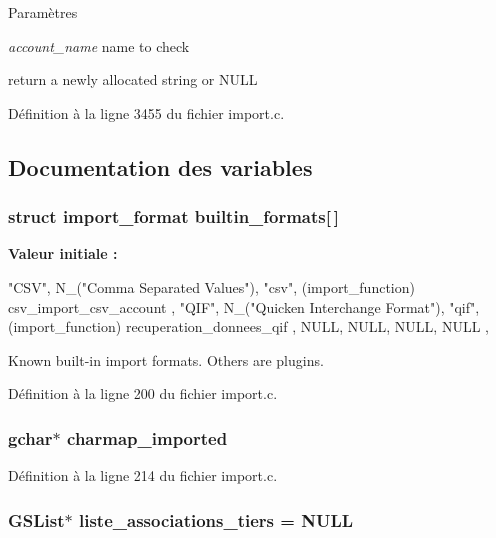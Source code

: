\begin{DoxyParams}{Paramètres}
\item[{\em account\_\-name}]name to check\end{DoxyParams}
return a newly allocated string or NULL 

Définition à la ligne 3455 du fichier import.c.



\subsection{Documentation des variables}
\subsubsection[{builtin\_\-formats}]{\setlength{\rightskip}{0pt plus 5cm}struct {\bf import\_\-format} {\bf builtin\_\-formats}[$\,$]}\label{import_8c_ad6a70f4778cc786375179b149bc44b24}
{\bfseries Valeur initiale :}
\begin{DoxyCode}
 {
{ "CSV", N_("Comma Separated Values"),     "csv", (import_function) 
      csv_import_csv_account },
{ "QIF", N_("Quicken Interchange Format"), "qif", (import_function) 
      recuperation_donnees_qif },
{ NULL,  NULL,              NULL,       NULL },
}
\end{DoxyCode}
Known built-\/in import formats. Others are plugins. 

Définition à la ligne 200 du fichier import.c.

\subsubsection[{charmap\_\-imported}]{\setlength{\rightskip}{0pt plus 5cm}gchar$\ast$ {\bf charmap\_\-imported}}\label{import_8c_ab4dbd4be47f9c5648daab02c47ff90e6}


Définition à la ligne 214 du fichier import.c.

\subsubsection[{liste\_\-associations\_\-tiers}]{\setlength{\rightskip}{0pt plus 5cm}GSList$\ast$ {\bf liste\_\-associations\_\-tiers} = NULL}\label{import_8c_a8521224403aeb524822a05746e899bcf}


